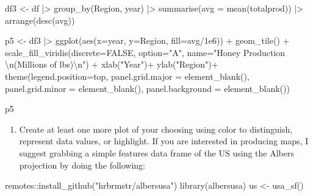 \documentclass[
]{article}
\newenvironment{Shaded}{\begin{snugshade}}{\end{snugshade}}
\newcommand{\AttributeTok}[1]{\textcolor[rgb]{0.77,0.63,0.00}{#1}}
\newcommand{\ConstantTok}[1]{\textcolor[rgb]{0.00,0.00,0.00}{#1}}
\newcommand{\FloatTok}[1]{\textcolor[rgb]{0.00,0.00,0.81}{#1}}
\newcommand{\FunctionTok}[1]{\textcolor[rgb]{0.00,0.00,0.00}{#1}}
\newcommand{\NormalTok}[1]{#1}
\newcommand{\OtherTok}[1]{\textcolor[rgb]{0.56,0.35,0.01}{#1}}
\newcommand{\SpecialCharTok}[1]{\textcolor[rgb]{0.00,0.00,0.00}{#1}}
\newcommand{\StringTok}[1]{\textcolor[rgb]{0.31,0.60,0.02}{#1}}
\providecommand{\tightlist}{%
  \setlength{\itemsep}{0pt}\setlength{\parskip}{0pt}}
\begin{document}
\begin{Shaded}
\begin{Highlighting}[]
\NormalTok{df3 }\OtherTok{\textless{}{-}}\NormalTok{ df }\SpecialCharTok{|\textgreater{}} 
    \FunctionTok{group\_by}\NormalTok{(Region, year) }\SpecialCharTok{|\textgreater{}} 
    \FunctionTok{summarise}\NormalTok{(}\AttributeTok{avg =} \FunctionTok{mean}\NormalTok{(totalprod)) }\SpecialCharTok{|\textgreater{}} 
  \FunctionTok{arrange}\NormalTok{(}\FunctionTok{desc}\NormalTok{(avg))}

\NormalTok{p5 }\OtherTok{\textless{}{-}}\NormalTok{ df3 }\SpecialCharTok{|\textgreater{}} 
  \FunctionTok{ggplot}\NormalTok{(}\FunctionTok{aes}\NormalTok{(}\AttributeTok{x=}\NormalTok{year, }\AttributeTok{y=}\NormalTok{Region, }\AttributeTok{fill=}\NormalTok{avg}\SpecialCharTok{/}\FloatTok{1e6}\NormalTok{)) }\SpecialCharTok{+}
  \FunctionTok{geom\_tile}\NormalTok{() }\SpecialCharTok{+}
  \FunctionTok{scale\_fill\_viridis}\NormalTok{(}\AttributeTok{discrete=}\ConstantTok{FALSE}\NormalTok{, }\AttributeTok{option=}\StringTok{"A"}\NormalTok{,}
                     \AttributeTok{name=}\StringTok{"Honey Production }\SpecialCharTok{\textbackslash{}n}\StringTok{(Millions of lbs)}\SpecialCharTok{\textbackslash{}n}\StringTok{"}\NormalTok{) }\SpecialCharTok{+}
  \FunctionTok{xlab}\NormalTok{(}\StringTok{"Year"}\NormalTok{)}\SpecialCharTok{+}
  \FunctionTok{ylab}\NormalTok{(}\StringTok{"Region"}\NormalTok{)}\SpecialCharTok{+}
  \FunctionTok{theme}\NormalTok{(}\AttributeTok{legend.position=}\StringTok{\textquotesingle{}top\textquotesingle{}}\NormalTok{, }\AttributeTok{panel.grid.major =} \FunctionTok{element\_blank}\NormalTok{(), }\AttributeTok{panel.grid.minor =} \FunctionTok{element\_blank}\NormalTok{(),}
\AttributeTok{panel.background =} \FunctionTok{element\_blank}\NormalTok{())}

\NormalTok{p5}
\end{Highlighting}
\end{Shaded}

\begin{enumerate}
\def\labelenumi{\arabic{enumi}.}
\setcounter{enumi}{5}
\tightlist
\item
  Create at least one more plot of your choosing using color to
  distinguish, represent data values, or highlight. If you are
  interested in producing maps, I suggest grabbing a simple features
  data frame of the US using the Albers projection by doing the
  following:
\end{enumerate}

\begin{Shaded}
\begin{Highlighting}[]
\NormalTok{remotes}\SpecialCharTok{::}\FunctionTok{install\_github}\NormalTok{(}\StringTok{"hrbrmstr/albersusa"}\NormalTok{)}
\FunctionTok{library}\NormalTok{(albersusa)}
\NormalTok{us }\OtherTok{\textless{}{-}} \FunctionTok{usa\_sf}\NormalTok{()}
\end{Highlighting}
\end{Shaded}
\end{document}
